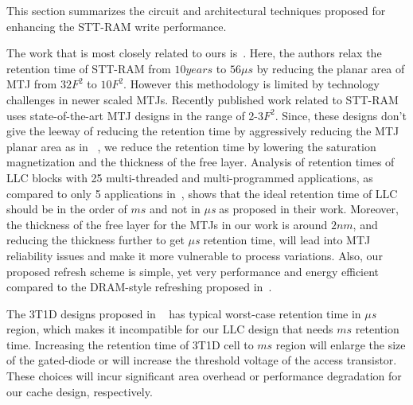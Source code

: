 


This section summarizes the circuit and architectural techniques proposed for enhancing the STT-RAM
write performance.

The work that is most closely related to ours is~\cite{STTRAM:HPCA11}.
Here, the authors relax the retention time of STT-RAM from $10 years$ to $56 \mu s$ by
reducing the planar area of MTJ from $32F^2$ to $10F^2$. However this methodology is limited by 
technology challenges in newer scaled MTJs. Recently published work related to
STT-RAM~\cite{PMTJ:Toshiba08,STTRAM:EDL11,STTRAM:Qualcomm09,STTRAM:Grandis11}
uses state-of-the-art MTJ designs in the range of 2-3$F^2$. Since, these designs don't give the
leeway of reducing the retention time by aggressively reducing the MTJ planar area as in~\cite{STTRAM:HPCA11} , we reduce the retention time by lowering the saturation magnetization and the thickness of the free layer. Analysis of retention times of LLC blocks with 25 multi-threaded and multi-programmed applications,
as compared to only 5 applications in~\cite{STTRAM:HPCA11}, shows that
the ideal retention time of LLC should be in the order of $ms$ and not in {\it $\mu$s} as proposed
in their work. Moreover, the thickness of the free layer for the MTJs in our work is 
around $2nm$, and reducing the thickness further
to get {\it $\mu$s} retention time, will lead into MTJ reliability issues
and make it more vulnerable to process variations. Also, our proposed refresh scheme is simple, yet very performance and energy efficient compared to the DRAM-style refreshing proposed in~\cite{STTRAM:HPCA11}.

The 3T1D designs proposed in ~\cite{3T-brooks} has typical worst-case retention time in {\it $\mu$s} region, which makes it incompatible for our LLC design that needs $ms$ retention time. Increasing the retention time of 3T1D cell to $ms$ region will enlarge the size of the gated-diode or will increase the threshold voltage of the access transistor. These choices will incur significant area overhead or performance degradation for our cache design, respectively. 

